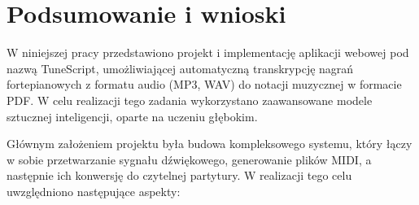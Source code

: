\documentclass[a4paper,twoside,12pt]{book}
\begin{document}
\clearpage
\begin{figure}[htbp]
    \centering
    \label{fig:generated_chopin}
    
\end{figure}
\clearpage
\begin{figure}[htbp]
    \centering
    \label{fig:original_chopin}
    
\end{figure}
\clearpage
\begin{figure}[htbp]
    \centering
    \label{fig:generated_waldstein}
    
\end{figure}
\clearpage
\begin{figure}[htbp]
    \centering
    \label{fig:original_waldstein}
    
\end{figure}
\clearpage
\begin{figure}[htbp]
    \centering
    \label{fig:generated_pathetique}
    
\end{figure}
\clearpage
\begin{figure}[htbp]
    \centering
    \label{fig:original_pathetique}
    
\end{figure}


\chapter{Podsumowanie i wnioski}
\label{ch:podsumowanie}

W niniejszej pracy przedstawiono projekt i implementację aplikacji webowej pod nazwą TuneScript, umożliwiającej automatyczną transkrypcję nagrań fortepianowych z formatu audio (MP3, WAV) do notacji muzycznej w formacie PDF. W celu realizacji tego zadania wykorzystano zaawansowane modele sztucznej inteligencji, oparte na uczeniu głębokim. 

Głównym założeniem projektu była budowa kompleksowego systemu, który łączy w sobie przetwarzanie sygnału dźwiękowego, generowanie plików MIDI, a następnie ich konwersję do czytelnej partytury. W realizacji tego celu uwzględniono następujące aspekty:
\end{document}
